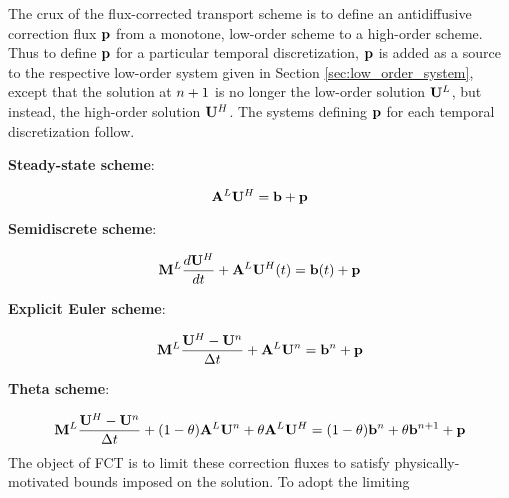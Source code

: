 The crux of the flux-corrected transport scheme is to define an antidiffusive
correction flux $\mathbf{p}$ from a monotone, low-order scheme to a
high-order scheme.  Thus to define $\mathbf{p}$ for a particular
temporal discretization, $\mathbf{p}$ is added as a source to the
respective low-order system given in Section \ref{sec:low_order_system}, except
that the solution at $n+1$ is no longer the low-order solution
$\lowordersolution$, but instead, the high-order solution $\highordersolution$.
The systems defining $\mathbf{p}$ for each temporal discretization
follow.
\begin{center}{\textbf{Steady-state scheme}:}\end{center}
\begin{equation}\label{eq:correction_flux_definition_steady_state}
  \loworderssmatrix\highordersolution = \ssrhs + \correctionfluxvector
\end{equation}
\begin{center}{\textbf{Semidiscrete scheme}:}\end{center}
\begin{equation}\label{eq:correction_flux_definition_semidiscrete}
  \lumpedmassmatrix\ddt{\highordersolution}
  + \loworderssmatrix\highordersolution(\timevalue)
  = \ssrhs(\timevalue) + \correctionfluxvector
\end{equation}
\begin{center}{\textbf{Explicit Euler scheme}:}\end{center}
\begin{equation}\label{eq:correction_flux_definition_explicit_euler}
  \lumpedmassmatrix\frac{\highordersolution-\solutionvector^\timeindex}
    {\timestepsize}
  + \loworderssmatrix\solutionvector^\timeindex
  = \ssrhs^\timeindex + \correctionfluxvector
\end{equation}
\begin{center}{\textbf{Theta scheme}:}\end{center}
\begin{equation}\label{eq:correction_flux_definition_theta}
  \lumpedmassmatrix\frac{\highordersolution-\solutionvector^\timeindex}
    {\timestepsize}
  + (1-\theta)\loworderssmatrix\solutionvector^\timeindex
  + \theta\loworderssmatrix\highordersolution
  = (1-\theta)\ssrhs^\timeindex + \theta\ssrhs^{\timeindex+1}
  + \correctionfluxvector
\end{equation}
The object of FCT is to limit these correction fluxes to satisfy
physically-motivated bounds imposed on the solution. To adopt the limiting
